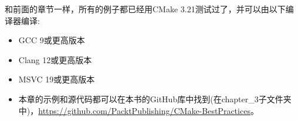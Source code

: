 
和前面的章节一样，所有的例子都已经用CMake 3.21测试过了，并可以由以下编译器编译:

\begin{itemize}
\item 
GCC 9或更高版本

\item 
Clang 12或更高版本

\item 
MSVC 19或更高版本

\item 
本章的示例和源代码都可以在本书的GitHub库中找到(在chapter\_3子文件夹中)，\url{https://github.com/PacktPublishing/CMake-BestPractices}。
\end{itemize}